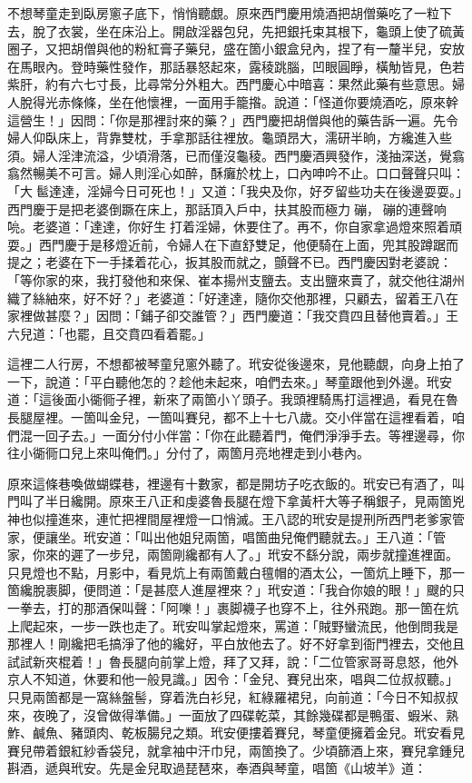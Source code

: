不想琴童走到臥房窻子底下，悄悄聽覷。原來西門慶用燒酒把胡僧藥吃了一粒下去，脫了衣裳，坐在床沿上。開啟淫器包兒，先把銀托束其根下，龜頭上使了硫黃圈子，又把胡僧與他的粉紅膏子藥兒，盛在箇小銀盒兒內，捏了有一釐半兒，安放在馬眼內。登時藥性發作，那話暴怒起來，露稜跳腦，凹眼圓睜，橫觔皆見，色若紫肝，約有六七寸長，比尋常分外粗大。西門慶心中暗喜：果然此藥有些意思。婦人脫得光赤條條，坐在他懷裡，一面用手籠揝。說道：「怪道你要燒酒吃，原來幹這營生！」因問：「你是那裡討來的藥？」西門慶把胡僧與他的藥告訴一遍。先令婦人仰臥床上，背靠雙枕，手拿那話往裡放。龜頭昂大，濡研半晌，方纔進入些須。婦人淫津流溢，少頃滑落，已而僅沒龜稜。西門慶酒興發作，淺抽深送，覺翕翕然暢美不可言。婦人則淫心如醉，酥癱於枕上，口內呻吟不止。口口聲聲只叫：「大𩫻䯲達達，淫婦今日可死也！」又道：「我央及你，好歹留些功夫在後邊耍耍。」{}西門慶于是把老婆倒蹶在床上，那話頂入戶中，扶其股而極力𢵞磞，𢵞磞的連聲响喨。老婆道：「達達，你好生𢵞打着淫婦，休要住了。再不，你自家拿過燈來照着頑耍。」西門慶于是移燈近前，令婦人在下直舒雙足，他便騎在上面，兜其股蹲踞而提之；老婆在下一手揉着花心，扳其股而就之，顫聲不已。西門慶因對老婆說：「等你家的來，我打發他和來保、崔本揚州支鹽去。支出鹽來賣了，就交他往湖州織了絲紬來，好不好？」老婆道：「好達達，隨你交他那裡，只顧去，留着王八在家裡做甚麼？」因問：「鋪子卻交誰管？」西門慶道：「我交賁四且替他賣着。」王六兒道：「也罷，且交賁四看着罷。」

這裡二人行房，不想都被琴童兒窻外聽了。玳安從後邊來，見他聽覷，向身上拍了一下，說道：「平白聽他怎的？趁他未起來，咱們去來。」琴童跟他到外邊。玳安道：「這後面小衚衕子裡，新來了兩箇小丫頭子。我頭裡騎馬打這裡過，看見在魯長腿屋裡。一箇叫金兒，一箇叫賽兒，都不上十七八歲。交小伴當在這裡看着，咱們混一回子去。」一面分付小伴當：「你在此聽着門，俺們淨淨手去。等裡邊尋，你往小衚衕口兒上來叫俺們。」分付了，兩箇月亮地裡走到小巷內。

原來這條巷喚做蝴蝶巷，裡邊有十數家，都是開坊子吃衣飯的。玳安已有酒了，叫門叫了半日纔開。原來王八正和虔婆魯長腿在燈下拿黃杆大等子稱銀子，見兩箇兇神也似撞進來，連忙把裡間屋裡燈一口悄滅。王八認的玳安是提刑所西門老爹家管家，便讓坐。玳安道：「叫出他姐兒兩箇，唱箇曲兒俺們聽就去。」王八道：「管家，你來的遲了一步兒，兩箇剛纔都有人了。」玳安不繇分說，兩步就撞進裡面。只見燈也不點，月影中，看見炕上有兩箇戴白氊帽的酒太公，一箇炕上睡下，那一箇纔脫裹脚，便問道：「是甚麼人進屋裡來？」玳安道：「我㒲你娘的眼！」颼的只一拳去，打的那酒保叫聲：「阿嚛！」裹脚襪子也穿不上，往外飛跑。那一箇在炕上爬起來，一步一跌也走了。玳安叫掌起燈來，罵道：「賊野蠻流民，他倒問我是那裡人！剛纔把毛搞淨了他的纔好，平白放他去了。好不好拿到衙門裡去，交他且試試新夾棍着！」魯長腿向前掌上燈，拜了又拜，說：「二位管家哥哥息怒，他外京人不知道，休要和他一般見識。」因令：「金兒、賽兒出來，唱與二位叔叔聽。」只見兩箇都是一窩絲盤髻，穿着洗白衫兒，紅綠羅裙兒，向前道：「今日不知叔叔來，夜晚了，沒曾做得準備。」一面放了四碟乾菜，其餘幾碟都是鴨蛋、蝦米、熟鮓、鹹魚、豬頭肉、乾板腸兒之類。{}玳安便摟着賽兒，琴童便擁着金兒。玳安看見賽兒帶着銀紅紗香袋兒，就拿袖中汗巾兒，兩箇換了。少頃篩酒上來，賽兒拿鍾兒斟酒，遞與玳安。先是金兒取過琵琶來，奉酒與琴童，唱箇《山坡羊》道：

